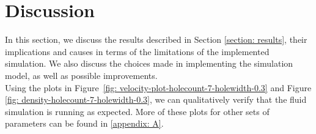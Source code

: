 \section{Discussion} \label{section: discussion}


In this section, we discuss the results described in Section \ref{section: results}, their implications and causes in terms of the limitations of the implemented simulation. We also discuss the choices made in implementing the simulation model, as well as possible improvements. \\

Using the plots in Figure~\ref{fig: velocity-plot-holecount-7-holewidth-0.3} and Figure \ref{fig: density-holecount-7-holewidth-0.3}, we can qualitatively verify that the fluid simulation is running as expected. More of these plots for other sets of parameters can be found in \ref{appendix: A}. \\

